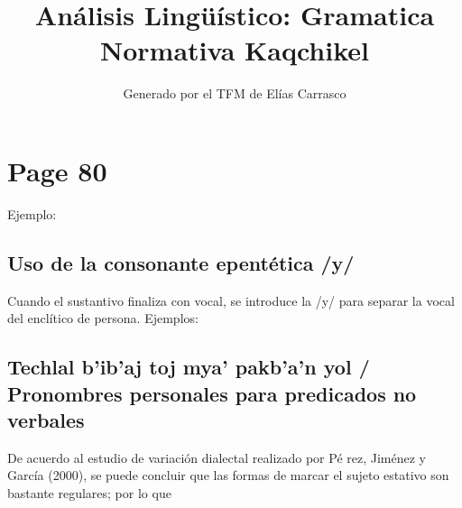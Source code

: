 \documentclass{article}%
\title{Análisis Lingüístico: Gramatica Normativa Kaqchikel}%
\author{Generado por el TFM de Elías Carrasco}%
\begin{document}
%
\normalsize%
\maketitle%
\section{Page 80}%
\label{sec:Page80}%
Ejemplo: %
\subsection{Uso de la consonante epentética /y/}%
\label{subsec:Usodelaconsonanteepenttica/y/}%

%
Cuando el sustantivo finaliza con vocal, se introduce la /y/ para %
separar la vocal del enclítico de persona. %
Ejemplos: %
\subsection{Techlal b'ib'aj toj mya' pakb'a'n yol / Pronombres personales para predicados no verbales}%
\label{subsec:Techlalbibajtojmyapakbanyol/Pronombrespersonalesparapredicadosnoverbales}%

%
De acuerdo al estudio de variación dialectal realizado por Pé %
rez, Jiménez y García (2000), se puede concluir que las formas %
de marcar el sujeto estativo son bastante regulares; por lo que 

%
\end{document}
